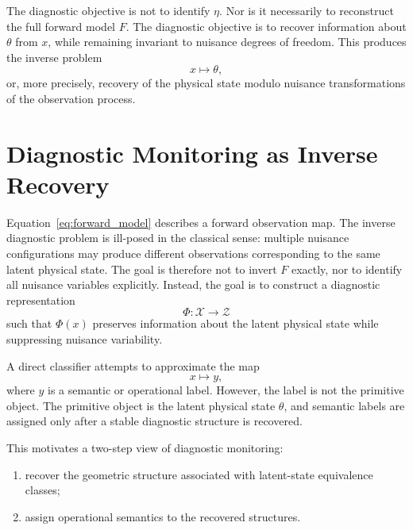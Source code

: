 \documentclass[11pt,letterpaper]{article}
\newcommand{\X}{\ensuremath{\mathcal{X}}}
\newcommand{\Z}{\ensuremath{\mathcal{Z}}}
\begin{document}
The diagnostic objective is not to identify \(\eta\). Nor is it necessarily to reconstruct the full forward model \(F\). The diagnostic objective is to recover information about \(\theta\) from \(x\), while remaining invariant to nuisance degrees of freedom. This produces the inverse problem
\begin{equation}
    x \longmapsto \theta,
    \label{eq:inverse_problem}
\end{equation}
or, more precisely, recovery of the physical state modulo nuisance transformations of the observation process.

\section{Diagnostic Monitoring as Inverse Recovery}

Equation~\eqref{eq:forward_model} describes a forward observation map.
The inverse diagnostic problem is ill-posed in the classical sense:
multiple nuisance configurations may produce different observations corresponding to the same latent physical state.
The goal is therefore not to invert \(F\) exactly, nor to identify all nuisance variables explicitly.
Instead, the goal is to construct a diagnostic representation
\begin{equation}
    \Phi: \X \rightarrow \Z
    \label{eq:representation}
\end{equation}
such that \(\Phi(x)\) preserves information about the latent physical state while suppressing nuisance variability.

A direct classifier attempts to approximate the map
\[
x \mapsto y,
\]
where \(y\) is a semantic or operational label.
However, the label is not the primitive object.
The primitive object is the latent physical state \(\theta\), and semantic labels are assigned only after a stable diagnostic structure is recovered.

This motivates a two-step view of diagnostic monitoring:

\begin{enumerate}[label=(\alph*)]
    \item recover the geometric structure associated with latent-state equivalence classes;
    \item assign operational semantics to the recovered structures.
\end{enumerate}
\end{document}
